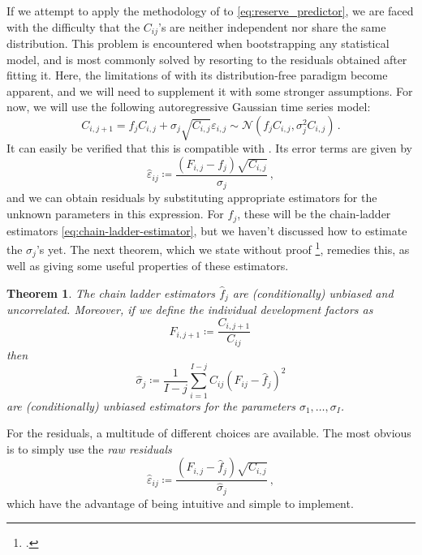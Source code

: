 \documentclass[a4paper]{book}
\theoremstyle{plain}
\newtheorem{theorem}{Theorem}
\begin{document}
If we attempt to apply the methodology of  to \eqref{eq:reserve_predictor}, we are faced with the difficulty that the $C_{ij}$'s are neither independent nor share the same distribution. This problem is encountered when bootstrapping any statistical model, and is most commonly solved by resorting to the residuals obtained after fitting it. Here, the limitations of  with its distribution-free paradigm become apparent, and we will need to supplement it with some stronger assumptions. For now, we will use the following autoregressive Gaussian time series model:
\begin{equation} \label{eq:time-series-model}
    C_{i, j+1} = f_j C_{i,j} + \sigma_j \sqrt{C_{i,j}} \varepsilon_{i, j} \sim \mathcal{N}(f_j C_{i, j}, \sigma_j^2 C_{i, j}) \,.
\end{equation}
It can easily be verified that this is compatible with . Its error terms are given by
\begin{equation}
    \hat{\varepsilon}_{ij} \coloneqq \frac{(F_{i, j} - f_j)\sqrt{C_{i, j}}}{\sigma_j} \,,
\end{equation}
and we can obtain residuals by substituting appropriate estimators for the unknown parameters in this expression. For $f_j$, these will be the chain-ladder estimators \ref{eq:chain-ladder-estimator}, but we haven't discussed how to estimate the $\sigma_j$'s yet. The next theorem, which we state without proof \footcite[The relevant proofs can be found in][17 \psqq]{wuthrich:stochastic-reserving}, remedies this, as well as giving some useful properties of these estimators.
\begin{theorem}
    The chain ladder estimators $\hat{f}_j$ are (conditionally) unbiased and uncorrelated. Moreover, if we define the individual development factors as
    \begin{equation}
        F_{i, j + 1} \coloneqq \frac{C_{i, j + 1}}{C_{ij}} \,
    \end{equation}
    then
    \begin{equation}
        \hat{\sigma}_j \coloneqq \frac{1}{I-j}\sum_{i=1}^{I-j} C_{ij}\left( F_{ij} - \hat{f}_j \right)^2
    \end{equation}
    are (conditionally) unbiased estimators for the parameters $\sigma_1, \dots, 
    \sigma_I$.
\end{theorem}
For the residuals, a multitude of different choices are available. The most obvious is to simply use the \emph{raw residuals}
\begin{equation}
\hat{\varepsilon}_{ij} \coloneqq \frac{(F_{i, j} - \hat{f}_j)\sqrt{C_{i, j}}}{\hat{\sigma}_j} \,,
\end{equation}
which have the advantage of being intuitive and simple to implement.
\end{document}
